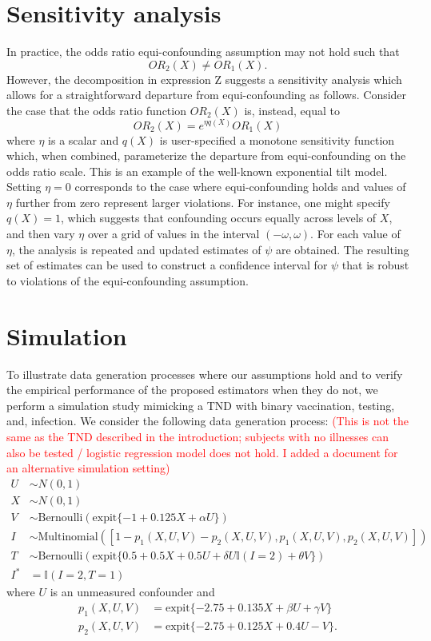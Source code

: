 \documentclass[11pt]{article}
\newcommand{\ken}{\textcolor{red}}
\begin{document}
\section{Sensitivity analysis}
In practice, the odds ratio equi-confounding assumption may not hold such that
$$OR_2(X) \neq OR_1(X).$$ 
However, the decomposition in expression Z suggests a sensitivity analysis which allows for a straightforward departure from equi-confounding as follows. Consider the case that the odds ratio function $OR_2(X)$ is, instead, equal to
$$ OR_2(X) = e^{\eta q(X)} OR_1(X) $$
where $\eta$ is a scalar and $q(X)$ is user-specified a monotone sensitivity function which, when combined, parameterize the departure from equi-confounding on the odds ratio scale. This is an example of the well-known exponential tilt model. Setting $\eta = 0$ corresponds to the case where equi-confounding holds and values of $\eta$ further from zero represent larger violations. For instance, one might specify $q(X) = 1$, which suggests that confounding occurs equally across levels of $X$, and then vary $\eta$ over a grid of values in the interval $(-\omega, \omega)$. For each value of $\eta$, the analysis is repeated and updated estimates of $\psi$ are obtained. The resulting set of estimates can be used to construct a confidence interval for $\psi$ that is robust to violations of the equi-confounding assumption.

\section{Simulation}

To illustrate data generation processes where our assumptions hold and to verify the empirical performance of the proposed estimators when they do not, we perform a simulation study mimicking a TND with binary vaccination, testing, and, infection. We
consider the following data generation process: \ken{(This is not the same as the TND described in the introduction; subjects with no illnesses can also be tested / logistic regression model does not hold. I added a document for an alternative simulation setting)}
    \begin{align*}
        U &\sim N(0,1)\\
        X &\sim N(0,1)\\
        V &\sim \text{Bernoulli}(\text{expit}\{-1 + 0.125 X + \alpha U\})\\
        I &\sim \text{Multinomial}([1 - p_1(X,U,V) - p_2(X,U,V), p_1(X, U,V), p_2(X,U,V)])\\
        T &\sim \text{Bernoulli}(\text{expit}\{0.5 + 0.5 X + 0.5 U + \delta U \mathbb{I}(I = 2) + \theta V \}) \\
        I^* &= \mathbb{I}(I = 2, T = 1)
    \end{align*}
where $U$ is an unmeasured confounder and
    \begin{align*}
        p_1(X,U,V) &= \text{expit}\{-2.75 + 0.135 X + \beta U + \gamma V\} \\
        p_2(X,U,V) & = \text{expit}\{-2.75 + 0.125 X + 0.4 U - V\}.
    \end{align*}
\end{document}
